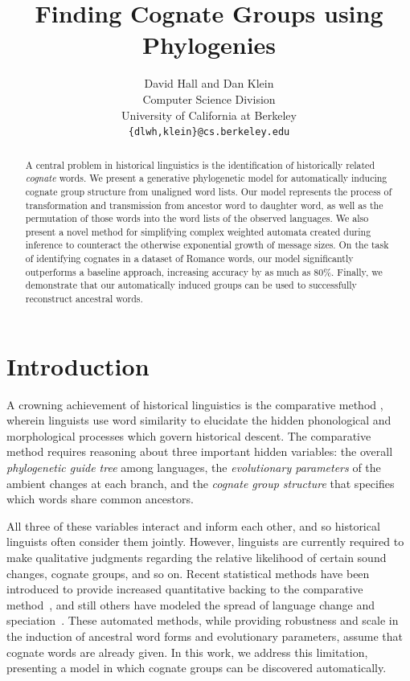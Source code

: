 \documentclass[11pt,a4paper]{article}
\title{Finding Cognate Groups using Phylogenies}
\author{David Hall and Dan Klein \\ Computer Science Division \\ University of California at Berkeley \\
\texttt{\{dlwh,klein\}@cs.berkeley.edu}}
\date{}
\begin{document}
\maketitle
\begin{abstract}
  A central problem in historical linguistics is the identification
  of historically related \emph{cognate} words.  We present a
  generative phylogenetic model for automatically inducing cognate
  group structure from unaligned word lists. Our model represents
  the process of transformation and transmission from ancestor word
  to daughter word, as well as the permutation of those words into
  the word lists of the observed languages. We also present a novel
  method for simplifying complex weighted automata created during
  inference to counteract the otherwise exponential growth of message
  sizes. On the task of identifying cognates in a dataset of Romance
  words, our model significantly outperforms a baseline approach,
  increasing accuracy by as much as 80\%. Finally, we demonstrate
  that our automatically induced groups can be used to successfully
  reconstruct ancestral words.
\end{abstract}
\section{Introduction}

A crowning achievement of historical linguistics is the comparative
method \cite{ohala93phonetics}, wherein linguists use word similarity
to elucidate the hidden phonological and morphological processes
which govern historical descent. The comparative method requires
reasoning about three important hidden variables: the overall
\emph{phylogenetic guide tree} among languages, the \emph{evolutionary
parameters} of the ambient changes at each branch, and the \emph{cognate
group structure} that specifies which words share common ancestors.

All three of these variables interact and inform each other, and
so historical linguists often consider them jointly.  However,
linguists are currently required to make qualitative judgments
regarding the relative likelihood of certain sound changes, cognate
groups, and so on.  Recent statistical methods have been introduced
to provide increased quantitative backing to the comparative
method~\cite{oakes00computer,bouchard07probabilistic,bouchard09improved},
and still others have modeled the spread of language change and
speciation~\cite{ringe02IE,daume07implication,daume09areal,nerbonne08measuring}.
These automated methods, while providing robustness and scale in
the induction of ancestral word forms and evolutionary parameters,
assume that cognate words are already given.  In this work, we
address this limitation, presenting a model in which cognate groups
can be discovered automatically.
\end{document}
